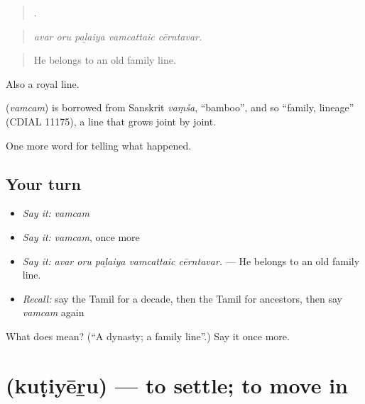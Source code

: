 \begin{quote}
    .
\end{quote}

\begin{quote}
\emph{avar oru paḻaiya vamcattaic cērntavar.}
\end{quote}

\begin{quote}
He belongs to an old family line.
\end{quote}

Also a royal line.

\begin{cousinweb}
\textbf{} (\emph{vamcam}) is borrowed from Sanskrit \emph{vaṃśa}, \textquotedblleft{}bamboo\textquotedblright{}, and so \textquotedblleft{}family, lineage\textquotedblright{} (CDIAL 11175), a line that grows joint by joint.
\end{cousinweb}

\begin{grammarlens}[title={What you've built}]
One more word for telling what happened.
\end{grammarlens}

\subsection*{Your turn}
\begin{itemize}
\raggedright
  \item \emph{Say it:} \emph{vamcam}
  \item \emph{Say it:} \emph{vamcam}, once more
  \item \emph{Say it:} \emph{avar oru paḻaiya vamcattaic cērntavar.} — He belongs to an old family line.
  \item \emph{Recall:} say the Tamil for a decade, then the Tamil for ancestors, then say \emph{vamcam} again
\end{itemize}

\begin{tcolorbox}[breakable,colback=teal!4,colframe=teal!35!black,title={Before you move on}]
What does  mean? (\textquotedblleft{}A dynasty; a family line\textquotedblright{}.) Say it once more.
\end{tcolorbox}
\section[\texorpdfstring{\ta{குடியேறு} (kuṭiyēṟu)}{குடியேறு (kuṭiyēṟu)}]{ (kuṭiyēṟu) — to settle; to move in}

